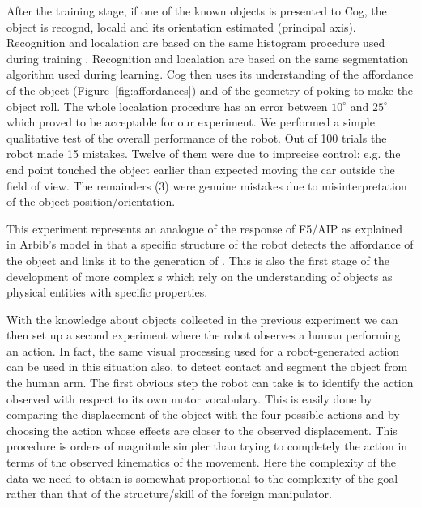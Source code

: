 
\fi

After the training stage, if one of the known objects is presented to Cog, the 
object is recogn\ize{}d, local\ize{}d and its orientation estimated (principal 
axis). 
\ifrevised
Recognition and local\iz{}ation are based on the same
\ahhcolor{} histogram procedure used during training \cite{swain91color}.
\else
Recognition and local\iz{}ation are based on the same \ahhcolor{} 
segmentation algorithm used during learning. 
\fi
Cog then uses its 
understanding of the affordance of the object (Figure~\ref{fig:affordances}) 
and of the geometry of poking to make the object roll. The whole local\iz{}ation 
procedure has an error between $10^{\circ}$ and $25^{\circ}$ which proved 
to be acceptable for our experiment. We performed a simple qualitative test of 
the overall performance of the robot. Out of 100 trials the robot made 15 
mistakes. Twelve of them were due to imprecise control: e.g. the end point 
touched the object earlier than expected moving the car outside the field of 
view. The remainders (3) were genuine mistakes due to misinterpretation of 
the object position/orientation.

This experiment represents an analogue of the response of F5/AIP as 
explained in Arbib's model \cite{fagg-arbib-1998} in that a specific 
structure of the robot detects the affordance of the object and links 
it to the generation of \ahhbehavior{}. This is also the first stage of 
the development of more complex \ahhbehavior{}s which rely on the understanding 
of objects as physical entities with specific properties.

With the knowledge about objects collected in the previous experiment
we can then set up a second experiment where the robot observes a human performing an action. In fact, the same visual processing 
used for \ahhanalyzing{} a robot-generated action can be used in this situation also, to detect contact and 
segment the object from the human arm. 
The first obvious step the robot can take is to identify the action 
observed with respect to its own motor vocabulary. This is easily done by 
comparing the displacement of the object with the four possible actions and 
by choosing the action whose effects are closer to the observed displacement. 
This procedure is orders of magnitude simpler than trying to completely 
\ahhcharacterize{} the action in terms of the observed kinematics of the movement. 
Here the complexity of the data we need to obtain is somewhat proportional 
to the complexity of the goal rather than that of the structure/skill of 
the foreign manipulator.


